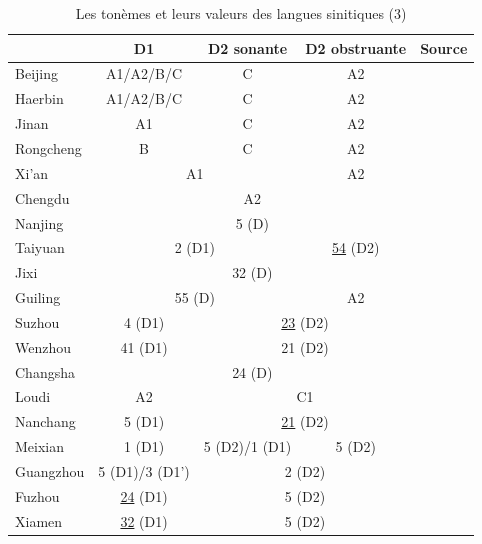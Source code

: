\documentclass{scrbook}
\newcounter{c}[subsubsection]
\begin{document}
\begin{sloppypar}
\begin{landscape}
\begin{table}[htbp]
  \centering

    \begin{tabular}{l|ccc|l}
    \toprule
          & D1    & D2 sonante & D2 obstruante & \multicolumn{1}{c}{Source} \\
    \midrule
    Beijing & A1/A2/B/C & C     & A2    & \textcite[36--37]{Qian2010mandarin} \\
    Haerbin & A1/A2/B/C & C     & A2    & \textcite[13]{Yin1997Haerbin} \\
    Jinan & A1    & C     & A2    & \textcite[36--37]{Qian2010mandarin} \\
    Rongcheng & B     & C     & A2    & \cite[69]{Wang1995rongcheng} \\
    Xi'an & \multicolumn{2}{c}{A1} & A2    & \textcite[38--39]{Qian2010mandarin} \\
    Chengdu & \multicolumn{3}{c|}{A2} & \textcite[17]{Liang1998Chendu} \\
    Nanjing & \multicolumn{3}{c|}{5 (D)} & \textcite[40--41]{Qian2010mandarin} \\
    Taiyuan & \multicolumn{2}{c}{2 (D1)} & \underline{54} (D2) & \textcite[40--41]{Qian2010mandarin} \\
    Jixi  & \multicolumn{3}{c|}{32 (D)} & \textcite[15]{Zhao2003Jixi} \\
    Guiling & \multicolumn{2}{c}{55 (D)} & A2    & \textcite[49]{Chen2022guilin} \\
    Suzhou & 4 (D1) & \multicolumn{2}{c|}{\underline{23} (D2)} & \cite[27,34]{Wang1996suzhou} \\
    Wenzhou & 41 (D1) & \multicolumn{2}{c|}{21 (D2)} & \textcite[19]{You1998Wenzhou} \\
    Changsha & \multicolumn{3}{c|}{24 (D)} & \textcite[129--130]{Bao1999changsha} \\
    Loudi & A2    & \multicolumn{2}{c|}{C1} & \textcite[104]{Liu2001loudi} \\
    \multicolumn{1}{l|}{\multirow{2}[0]{*}{Nanchang}} & \multirow{2}[0]{*}{5 (D1)} & \multicolumn{2}{c|}{\multirow{2}[0]{*}{\underline{21} (D2)}} & \multirow{2}[0]{*}{\textcite[276-277]{Xiong1979nanchang}} \\
          & \multicolumn{2}{c}{} &  \\
    Meixian & 1 (D1) & 5 (D2)/1 (D1) & 5 (D2) & \textcite[17--19]{Huang1995Meixian} \\
    Guangzhou & 5 (D1)/3 (D1') & \multicolumn{2}{c|}{2 (D2)} & \textcite[10]{Zhan2002yue} \\
    Fuzhou & \underline{24} (D1) & \multicolumn{2}{c|}{5 (D2)} & \textcite[66]{Chen1998fuzhou} \\
    Xiamen & \underline{32} (D1) & \multicolumn{2}{c|}{5 (D2)} & \textcite[179]{Zhou1998xiamen_yanjiu} \\
    \bottomrule
    \end{tabular}%
  \caption{Les tonèmes et leurs valeurs des langues sinitiques (3)}
  \label{tab:ton_valeur3}%
\end{table}%
\end{landscape}


\end{sloppypar}
\end{document}
